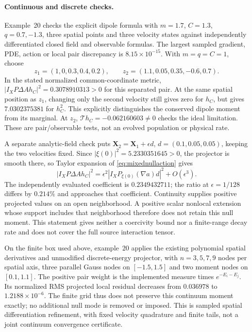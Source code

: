 \documentclass[11pt,letterpaper]{article}
\newcommand{\X}{\mathbf X}
\begin{document}
\paragraph{Continuous and discrete checks.}
Example~20 checks the explicit dipole formula with $m=1.7$, $C=1.3$,
$q=0.7,-1.3$, three spatial points and three velocity states against
independently differentiated closed field and observable formulas.
The largest sampled gradient, PDE, action or local pair discrepancy is
$8.15\times10^{-15}$. With $m=q=C=1$, choose
\[
 z_1=(1,0,0.3,0.4,0.2),\qquad
 z_2=(1.1,0.05,0.35,-0.6,0.7).
\]
In the stated normalized common-coordinate metric,
$|I_XP\Delta A h_C|^2=0.3078910313>0$ for this separated pair.
At the same spatial position as $z_1$, changing only the second velocity
still gives zero for $h_C$, but gives $7.0302375381$ for $h_C^2$.
This explicitly distinguishes the conserved dipole moment from its marginal.
At $z_2$, $\mathcal T h_C=-0.062160603\ne0$ checks the ideal limitation.
These are pair/observable tests, not an evolved population or physical rate.

A separate analytic-field check puts
$\X_2=\X_1+\epsilon d$, $d=(0.1,0.05,0.05)$, keeping the two velocities
fixed. Since $|\xi(0)|^2=5.2330351645>0$, the projector is smooth there,
so Taylor expansion of \eqref{eq:mixednullaction} gives
\begin{equation}
 |I_XP\Delta A h_C|^2
 =\epsilon^2|I_XP_{\xi(0)}(\nabla a)d|^2+O(\epsilon^3).
\end{equation}
The independently evaluated coefficient is $0.2349432711$; the ratio at
$\epsilon=1/128$ differs by $0.214\%$ and approaches that coefficient.
Continuity supplies positive projected values on an open neighborhood.
A positive scalar nonlocal extension whose support includes that neighborhood
therefore does not retain this null moment. This statement gives neither a
coercivity bound nor a finite-range decay rate and does not cover the full
source interaction tensor.

On the finite box used above, example~20 applies the existing polynomial
spatial derivatives and unmodified discrete-energy projector, with
$n=3,5,7,9$ nodes per spatial axis, three parallel Gauss nodes on
$[-1.5,1.5]$ and two moment nodes on $[0.1,1.1]$. The positive pair weight
is the implemented measure times $e^{-E_i-E_j}$. Its normalized RMS projected
local residual decreases from $0.036978$ to $1.2188\times10^{-6}$.
The finite grid thus does not preserve this continuum moment exactly; no
additional null mode is removed or imposed. This is sampled spatial
differentiation refinement, with fixed velocity quadrature and finite tails,
not a joint continuum convergence certificate.
\end{document}
